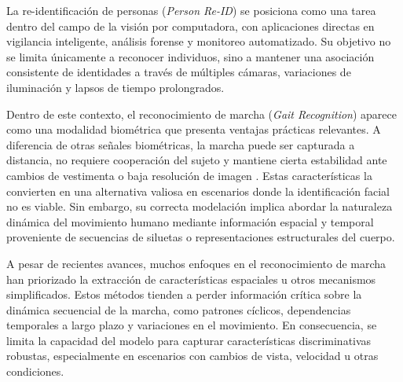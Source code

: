 La re-identificación de personas (\textit{Person Re-ID}) se posiciona como una tarea dentro del campo de la visión por computadora, con aplicaciones directas en vigilancia inteligente, análisis forense y monitoreo automatizado. Su objetivo no se limita únicamente a reconocer individuos, sino a mantener una asociación consistente de identidades a través de múltiples cámaras, variaciones de iluminación y lapsos de tiempo prolongrados.

Dentro de este contexto, el reconocimiento de marcha (\textit{Gait Recognition}) aparece como una modalidad biométrica que presenta ventajas prácticas relevantes. A diferencia de otras señales biométricas, la marcha puede ser capturada a distancia, no requiere cooperación del sujeto y mantiene cierta estabilidad ante cambios de vestimenta o baja resolución de imagen \citep{Purish2023GaitRecognition}. Estas características la convierten en una alternativa valiosa en escenarios donde la identificación facial no es viable. Sin embargo, su correcta modelación implica abordar la naturaleza dinámica del movimiento humano mediante información espacial y temporal proveniente de secuencias de siluetas o representaciones estructurales del cuerpo.

A pesar de recientes avances, muchos enfoques en el reconocimiento de marcha han priorizado la extracción de características espaciales u otros mecanismos simplificados. Estos métodos tienden a perder información crítica sobre la dinámica secuencial de la marcha, como patrones cíclicos, dependencias temporales a largo plazo y variaciones en el movimiento. En consecuencia, se limita la capacidad del modelo para capturar características discriminativas robustas, especialmente en escenarios con cambios de vista, velocidad u otras condiciones.

